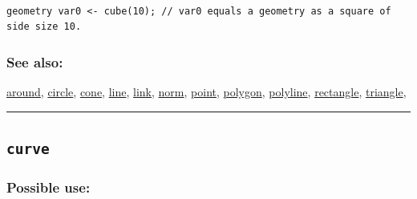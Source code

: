 \documentclass[]{book}
\theoremstyle{definition}
\theoremstyle{definition}
\theoremstyle{definition}
\theoremstyle{remark}
\begin{document}
\begin{verbatim}
 
geometry var0 <- cube(10); // var0 equals a geometry as a square of side size 10.
\end{verbatim}

\subsubsection{See also:}\label{see-also-73}

\href{operators-a-to-a.html\#around}{around},
\href{operators-b-to-c.html\#circle}{circle},
\href{operators-b-to-c.html\#cone}{cone},
\href{operators-i-to-m.html\#line}{line},
\href{operators-i-to-m.html\#link}{link},
\href{operators-n-to-r.html\#norm}{norm},
\href{operators-n-to-r.html\#point}{point},
\href{operators-n-to-r.html\#polygon}{polygon},
\href{operators-n-to-r.html\#polyline}{polyline},
\href{operators-n-to-r.html\#rectangle}{rectangle},
\href{operators-s-to-z.html\#triangle}{triangle},

\begin{center}\rule{0.5\linewidth}{\linethickness}\end{center}

\subsection{\texorpdfstring{\texttt{curve}}{curve}}\label{curve}

\subsubsection{Possible use:}\label{possible-use-122}
\end{document}
